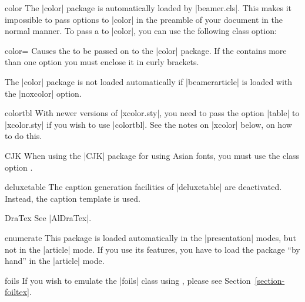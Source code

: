 \begin{package}{{color}}
  \beamernote
  The |color| package is automatically loaded by |beamer.cls|. This makes it impossible to pass options to |color| in the preamble of your document in the normal manner. To pass a  to |color|, you can use the following class option:

  \begin{classoption}{color={\normalfont{}}}
  Causes the  to be passed on to the |color| package. If the  contains more than one option you must enclose it in curly brackets.
  \end{classoption}

  \articlenote
  The |color| package is not loaded automatically if |beamerarticle| is loaded with the |noxcolor| option.
\end{package}

\begin{package}{{colortbl}}
  \beamernote
  With newer versions of |xcolor.sty|, you need to pass the option |table| to |xcolor.sty| if you wish to use |colortbl|. See the notes on |xcolor| below, on how to do this.
\end{package}

\begin{package}{{CJK}}
  \beamernote
  When using the |CJK| package for using Asian fonts, you must use the class option .
\end{package}

\begin{package}{{deluxetable}}
  \beamernote
  The caption generation facilities of |deluxetable| are deactivated. Instead, the caption template is used.
\end{package}

\begin{package}{{DraTex}}
  See |AlDraTex|.
\end{package}

\begin{package}{{enumerate}}
  \articlenote
  This package is loaded automatically in the |presentation| modes, but not in the |article| mode. If you use its features, you have to load the package ``by hand'' in the |article| mode.
\end{package}

\begin{class}{{foils}}
  If you wish to emulate the |foils| class using \beamer, please see Section~\ref{section-foiltex}.
\end{class}


